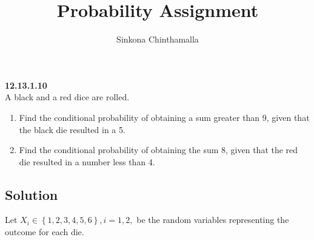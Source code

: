 \documentclass[10pt,twocolumn]{article}
\title{\textbf{Probability Assignment}}
\author{Sinkona Chinthamalla}
\providecommand{\cbrak}[1]{\ensuremath{\left\{#1\right\}}}
\begin{document}
\maketitle

\textbf {12.13.1.10} \\
A black and a red dice are rolled.
\begin{enumerate}
\item Find the conditional probability of obtaining a sum greater than 9, given that the black die resulted in a 5.
\item Find the conditional probability of obtaining the sum 8, given that the red die resulted in a number less than 4.
\end{enumerate}

\subsection*{Solution}
Let $X_i \in \cbrak{1,2,3,4,5,6}, i = 1,2,$ be the random variables representing the outcome for each die.
\end{document}
